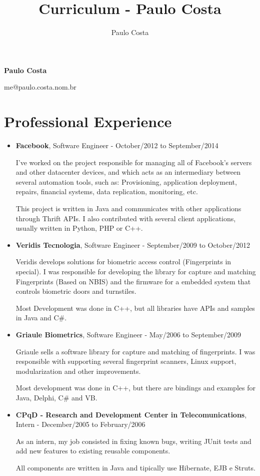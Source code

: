 \documentclass[a4paper,10pt]{article}
\title{Curriculum - Paulo Costa}
\author{Paulo Costa}
\begin{document}
  \LARGE\textbf{Paulo Costa}

  \large me@paulo.costa.nom.br



  \normalsize 
  
  \section{Professional Experience}
    \begin{itemize}
      \item
        \textbf{Facebook}, Software Engineer - October/2012 to September/2014
        
        I've worked on the project responsible for managing all of Facebook's servers and other datacenter devices, and which acts as an intermediary between several automation tools, such as: Provisioning, application deployment, repairs, financial systems, data replication, monitoring, etc.
        
        This project is written in Java and communicates with other applications through Thrift APIs. I also contributed with several client applications, usually written in Python, PHP or C++.

    
      \item  
        \textbf{Veridis Tecnologia}, Software Engineer - September/2009 to October/2012

        Veridis develops solutions for biometric access control (Fingerprints in special). I was responsible for developing the library for capture and  matching Fingerprints (Based on NBIS) and the firmware for a embedded system that controls biometric doors and turnstiles.
        
        Most Development was done in C++, but all libraries have APIs and samples in Java and C\#.

      \item  
        \textbf{Griaule Biometrics}, Software Engineer - May/2006 to September/2009

        Griaule sells a software library for capture and matching of fingerprints. I was responsible with supporting several fingerprint scanners, Linux support, modularization and other improvements.
        
        Most development was done in C++, but there are bindings and examples for Java, Delphi, C\# and VB.

      \item
        \textbf{CPqD - Research and Development Center in Telecomunications}, Intern - December/2005 to February/2006

        As an intern, my job consisted in fixing known bugs, writing JUnit tests and add new features to existing reusable components.

        All components are written in Java and tipically use Hibernate, EJB e Struts.
    \end{itemize}
    
\end{document}
